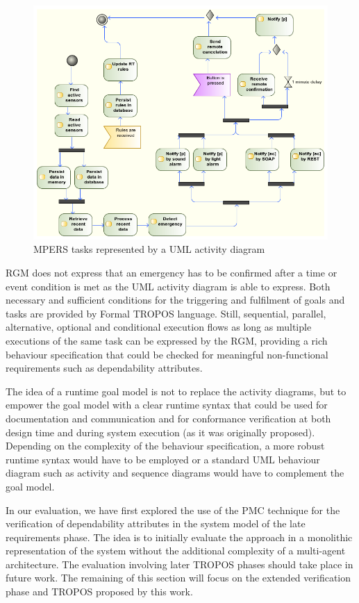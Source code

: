 \begin{figure}[h!]
\centering
\includegraphics[width=1\textwidth]{imgs/MPERS_UMLAD.png}
\caption{MPERS tasks represented by a UML activity diagram}
\label{fig:MPERS_UMLAD}
\end{figure}

RGM does not express that an emergency has to be confirmed after a time or event condition is met as the UML activity diagram is able to express. Both necessary and sufficient conditions for the triggering and fulfilment of goals and tasks are provided by Formal TROPOS language.  Still, sequential, parallel, alternative, optional and conditional execution flows as long as multiple executions of the same task can be expressed by the RGM, providing a rich behaviour specification that could be checked for meaningful non-functional requirements such as dependability attributes.

The idea of a runtime goal model is not to replace the activity diagrams, but to empower the goal model with a clear runtime syntax that could be used for 
documentation and communication and for conformance verification at both design time and during system execution (as it was originally proposed). Depending on the complexity of the behaviour specification, a more robust runtime syntax would have to be employed or a standard UML behaviour diagram such as activity and sequence diagrams would have to complement the goal model.

In our evaluation, we have first explored the use of the PMC technique for the verification of dependability attributes in the system model of the late requirements phase. The idea is to initially evaluate the approach in a monolithic representation of the system without the additional complexity of a multi-agent architecture. The evaluation involving later TROPOS phases should take place in future work. The remaining of this section will focus on the extended verification phase and TROPOS proposed by this work.

